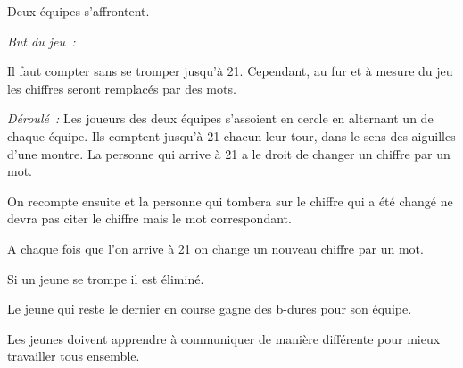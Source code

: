 \documentclass{grand-jeu}
\begin{document}
\begin{regles}
Deux équipes s’affrontent.

\vspace{0.2cm}
\emph{But du jeu :}

Il faut compter sans se tromper jusqu'à 21. Cependant, au fur et à mesure du jeu les chiffres seront remplacés par des mots. 

\vspace{0.2cm}
\emph{Déroulé :}
Les joueurs des deux équipes s'assoient en cercle en alternant un de chaque équipe. Ils comptent jusqu'à 21 chacun leur tour, dans le sens des aiguilles d’une montre. La personne qui arrive à 21 a le droit de changer un chiffre par un mot. 

On recompte ensuite et la personne qui tombera sur le chiffre qui a été changé ne devra pas citer le chiffre mais le mot correspondant. 

A chaque fois que l'on arrive à 21 on change un nouveau chiffre par un mot. 

Si un jeune se trompe il est éliminé.

Le jeune qui reste le dernier en course gagne des b-dures pour son équipe.
\end{regles}

\begin{imaginaire}
Les jeunes doivent apprendre à communiquer de manière différente pour mieux travailler tous ensemble.
\end{imaginaire}

\begin{moments-stop}
\end{moments-stop}
\end{document}
